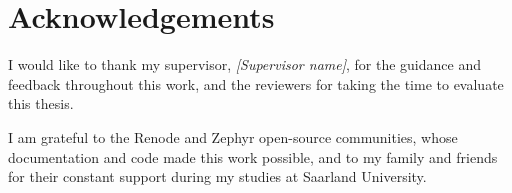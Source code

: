 \chapter*{Acknowledgements}

I would like to thank my supervisor, \emph{[Supervisor name]}, for the
guidance and feedback throughout this work, and the reviewers for taking
the time to evaluate this thesis.

I am grateful to the Renode and Zephyr open-source communities, whose
documentation and code made this work possible, and to my family and
friends for their constant support during my studies at Saarland
University.
